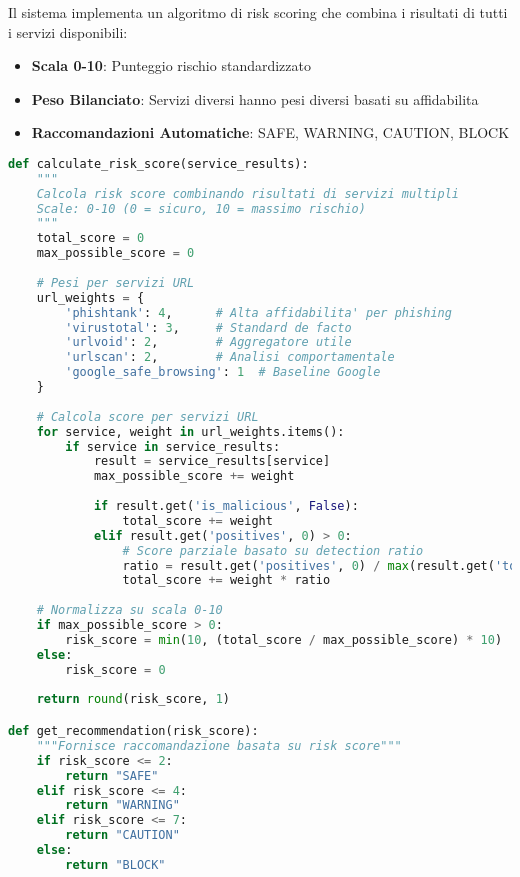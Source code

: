 \documentclass{article}
\begin{document}
Il sistema implementa un algoritmo di risk scoring che combina i risultati di tutti i servizi disponibili:

\begin{itemize}
    \item \textbf{Scala 0-10}: Punteggio rischio standardizzato
    \item \textbf{Peso Bilanciato}: Servizi diversi hanno pesi diversi basati su affidabilita
    \item \textbf{Raccomandazioni Automatiche}: SAFE, WARNING, CAUTION, BLOCK
\end{itemize}

\begin{lstlisting}[language=Python, caption=Esempio algoritmo risk scoring]
def calculate_risk_score(service_results):
    """
    Calcola risk score combinando risultati di servizi multipli
    Scale: 0-10 (0 = sicuro, 10 = massimo rischio)
    """
    total_score = 0
    max_possible_score = 0
    
    # Pesi per servizi URL
    url_weights = {
        'phishtank': 4,      # Alta affidabilita' per phishing
        'virustotal': 3,     # Standard de facto
        'urlvoid': 2,        # Aggregatore utile
        'urlscan': 2,        # Analisi comportamentale
        'google_safe_browsing': 1  # Baseline Google
    }
    
    # Calcola score per servizi URL
    for service, weight in url_weights.items():
        if service in service_results:
            result = service_results[service]
            max_possible_score += weight
            
            if result.get('is_malicious', False):
                total_score += weight
            elif result.get('positives', 0) > 0:
                # Score parziale basato su detection ratio
                ratio = result.get('positives', 0) / max(result.get('total', 1), 1)
                total_score += weight * ratio
    
    # Normalizza su scala 0-10
    if max_possible_score > 0:
        risk_score = min(10, (total_score / max_possible_score) * 10)
    else:
        risk_score = 0
    
    return round(risk_score, 1)

def get_recommendation(risk_score):
    """Fornisce raccomandazione basata su risk score"""
    if risk_score <= 2:
        return "SAFE"
    elif risk_score <= 4:
        return "WARNING"
    elif risk_score <= 7:
        return "CAUTION"
    else:
        return "BLOCK"
\end{lstlisting}
\end{document}
